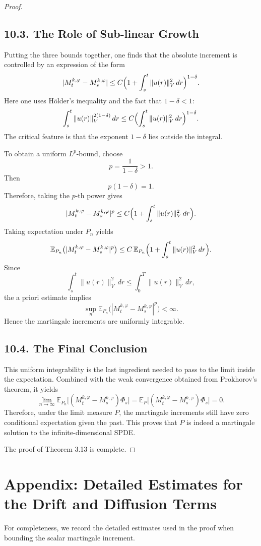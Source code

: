 \documentclass[11pt]{article}
\theoremstyle{definition}
\theoremstyle{remark}
\begin{document}
\begin{proof}
\subsection*{10.3. The Role of Sub-linear Growth}
Putting the three bounds together, one finds that the absolute increment is controlled by an expression of the form
\[
  |M_t^{k,\varphi}-M_s^{k,\varphi}|
  \le C\Bigl(1+\int_s^t \|u(r)\|_V^2\,dr\Bigr)^{1-\delta}.
\]
Here one uses H\"older's inequality and the fact that $1-\delta<1$:
\[
  \int_s^t \|u(r)\|_V^{2(1-\delta)}\,dr \le C\Bigl(\int_s^t \|u(r)\|_V^2\,dr\Bigr)^{1-\delta}.
\]
The critical feature is that the exponent $1-\delta$ lies outside the integral.

To obtain a uniform $L^p$-bound, choose
\[
  p=\frac{1}{1-\delta}>1.
\]
Then
\[
  p(1-\delta)=1.
\]
Therefore, taking the $p$-th power gives
\[
  |M_t^{k,\varphi}-M_s^{k,\varphi}|^p
  \le
  C\Bigl(1+\int_s^t \|u(r)\|_V^2\,dr\Bigr).
\]
Taking expectation under $P_n$ yields
\[
  \mathbb E_{P_n}\bigl(|M_t^{k,\varphi}-M_s^{k,\varphi}|^p\bigr)
  \le
  C\,\mathbb E_{P_n}\Bigl(1+\int_s^t \|u(r)\|_V^2\,dr\Bigr).
\]
Since
\[
  \int_s^t \|u(r)\|_V^2\,dr\le \int_0^T \|u(r)\|_V^2\,dr,
\]
the a priori estimate implies
\[
  \sup_n \mathbb E_{P_n}\bigl(|M_t^{k,\varphi}-M_s^{k,\varphi}|^p\bigr)<\infty.
\]
Hence the martingale increments are uniformly integrable.

\subsection*{10.4. The Final Conclusion}
This uniform integrability is the last ingredient needed to pass to the limit inside the expectation. Combined with the weak convergence obtained from Prokhorov's theorem, it yields
\[
  \lim_{n\to\infty}\mathbb E_{P_n}\bigl[(M_t^{k,\varphi}-M_s^{k,\varphi})\Phi_s\bigr]
  =
  \mathbb E_{P}\bigl[(M_t^{k,\varphi}-M_s^{k,\varphi})\Phi_s\bigr]
  =0.
\]
Therefore, under the limit measure $P$, the martingale increments still have zero conditional expectation given the past. This proves that $P$ is indeed a martingale solution to the infinite-dimensional SPDE.

The proof of Theorem 3.13 is complete.

\end{proof}

\section*{Appendix: Detailed Estimates for the Drift and Diffusion Terms}
For completeness, we record the detailed estimates used in the proof when bounding the scalar martingale increment.
\end{document}
